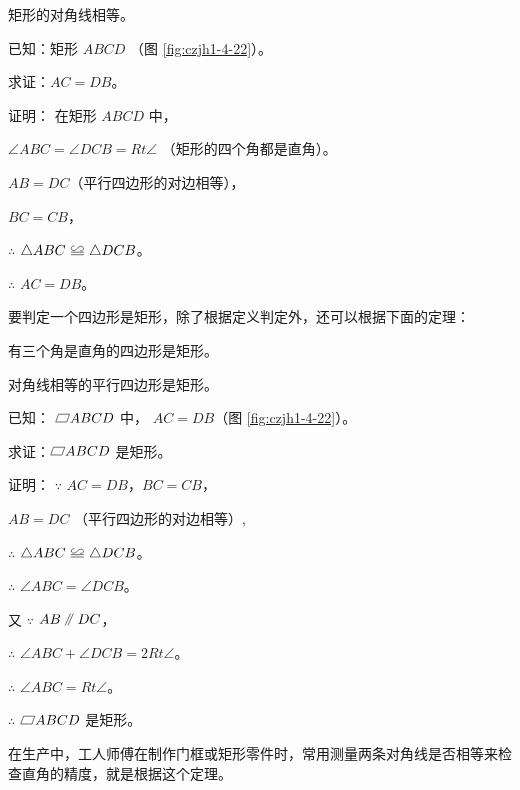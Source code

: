 \begin{dingli}[矩形性质定理2]
    矩形的对角线相等。
\end{dingli}


已知：矩形 $ABCD$ （图 \ref{fig:czjh1-4-22}）。

求证：$AC = DB$。

证明： 在矩形 $ABCD$ 中，

$\angle ABC = \angle DCB = Rt \angle$ （矩形的四个角都是直角）。

$AB = DC$（平行四边形的对边相等），

$BC = CB$，

$\therefore$ \quad $\triangle ABC \quandeng \triangle DCB$。

$\therefore$ \quad $AC = DB$。


要判定一个四边形是矩形，除了根据定义判定外，还可以根据下面的定理：

\begin{dingli}[矩形判定定理1]
    有三个角是直角的四边形是矩形。
\end{dingli}


\begin{dingli}[矩形判定定理2]
    对角线相等的平行四边形是矩形。
\end{dingli}


已知： $\pxsbx ABCD$ 中， $AC = DB$（图 \ref{fig:czjh1-4-22}）。

求证：$\pxsbx ABCD$ 是矩形。

证明： $\because$ \quad $AC = DB$，$BC = CB$，

\qquad $AB = DC$ （平行四边形的对边相等）,

$\therefore$ \quad $\triangle ABC \quandeng \triangle DCB$。

$\therefore$ \quad $\angle ABC = \angle DCB$。

又 $\because$ \quad $AB \pingxing DC$，

$\therefore$ \quad $\angle ABC + \angle DCB = 2 Rt \angle$。

$\therefore$ \quad $\angle ABC = Rt \angle$。

$\therefore$ \quad $\pxsbx ABCD$ 是矩形。

在生产中，工人师傅在制作门框或矩形零件时，常用测量两条对角线是否相等来检查直角的精度，就是根据这个定理。


